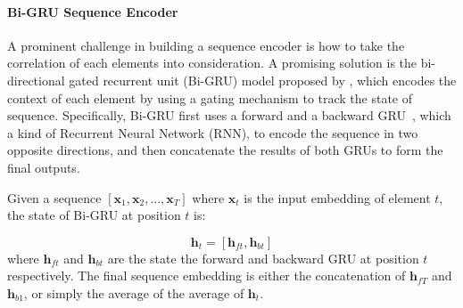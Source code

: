 \paragraph{Bi-GRU Sequence Encoder} 
A prominent challenge in building a sequence encoder is how to take the correlation of each elements into consideration. A promising solution is the bi-directional gated recurrent unit (Bi-GRU) model proposed by \cite{bahdanau2015neural}, which encodes the context of each element by using a gating mechanism to track the state of sequence.
Specifically, Bi-GRU first uses a forward and a backward GRU~\cite{cho2014learning}, which a kind of Recurrent Neural Network (RNN), to encode the sequence in two opposite directions, and then concatenate the results of both GRUs to form the final outputs. 

Given a sequence $[\mathbf{x}_1, \mathbf{x}_2, ..., \mathbf{x}_T]$ where $\mathbf{x}_t$ is the input embedding of element $t$, the state of Bi-GRU at position $t$ is:

\begin{equation}
\mathbf{h}_t = [\mathbf{h}_{ft}, \mathbf{h}_{bt}]
\end{equation}
where $\mathbf{h}_{ft}$ and $\mathbf{h}_{bt}$ are the state the forward and backward GRU at position $t$ respectively. The final sequence embedding is either the concatenation of $\mathbf{h}_{fT}$ and $\mathbf{h}_{b1}$, or simply the average of the average of $\mathbf{h}_t$.





